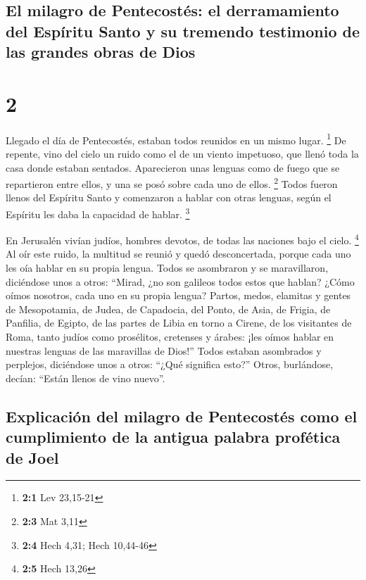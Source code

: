 \hypertarget{el-milagro-de-pentecostuxe9s-el-derramamiento-del-espuxedritu-santo-y-su-tremendo-testimonio-de-las-grandes-obras-de-dios}{%
\subsection{El milagro de Pentecostés: el derramamiento del Espíritu
Santo y su tremendo testimonio de las grandes obras de
Dios}\label{el-milagro-de-pentecostuxe9s-el-derramamiento-del-espuxedritu-santo-y-su-tremendo-testimonio-de-las-grandes-obras-de-dios}}

\hypertarget{section-1}{%
\section{2}\label{section-1}}

 Llegado el día de Pentecostés, estaban todos reunidos en
un mismo lugar. \footnote{\textbf{2:1} Lev 23,15-21}  De
repente, vino del cielo un ruido como el de un viento impetuoso, que
llenó toda la casa donde estaban sentados.  Aparecieron
unas lenguas como de fuego que se repartieron entre ellos, y una se posó
sobre cada uno de ellos. \footnote{\textbf{2:3} Mat 3,11} 
Todos fueron llenos del Espíritu Santo y comenzaron a hablar con otras
lenguas, según el Espíritu les daba la capacidad de hablar. \footnote{\textbf{2:4}
  Hech 4,31; Hech 10,44-46}

 En Jerusalén vivían judíos, hombres devotos, de todas las
naciones bajo el cielo. \footnote{\textbf{2:5} Hech 13,26}
 Al oír este ruido, la multitud se reunió y quedó
desconcertada, porque cada uno les oía hablar en su propia lengua.
 Todos se asombraron y se maravillaron, diciéndose unos a
otros: ``Mirad, ¿no son galileos todos estos que hablan? 
¿Cómo oímos nosotros, cada uno en su propia lengua? 
Partos, medos, elamitas y gentes de Mesopotamia, de Judea, de Capadocia,
del Ponto, de Asia,  de Frigia, de Panfilia, de Egipto,
de las partes de Libia en torno a Cirene, de los visitantes de Roma,
tanto judíos como prosélitos,  cretenses y árabes: ¡les
oímos hablar en nuestras lenguas de las maravillas de Dios!''
 Todos estaban asombrados y perplejos, diciéndose unos a
otros: ``¿Qué significa esto?''  Otros, burlándose,
decían: ``Están llenos de vino nuevo''.

\hypertarget{explicaciuxf3n-del-milagro-de-pentecostuxe9s-como-el-cumplimiento-de-la-antigua-palabra-profuxe9tica-de-joel}{%
\subsection{Explicación del milagro de Pentecostés como el cumplimiento
de la antigua palabra profética de
Joel}\label{explicaciuxf3n-del-milagro-de-pentecostuxe9s-como-el-cumplimiento-de-la-antigua-palabra-profuxe9tica-de-joel}}

